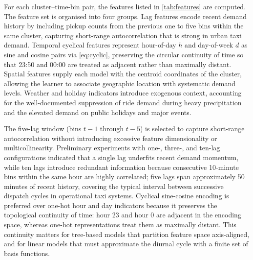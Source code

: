 For each cluster--time-bin pair, the features listed in \autoref{tab:features} are computed. The feature set is organised into four groups. Lag features encode recent demand history by including pickup counts from the previous one to five bins within the same cluster, capturing short-range autocorrelation that is strong in urban taxi demand. Temporal cyclical features represent hour-of-day $h$ and day-of-week $d$ as sine and cosine pairs via \eqref{eq:cyclic}, preserving the circular continuity of time so that 23:50 and 00:00 are treated as adjacent rather than maximally distant. Spatial features supply each model with the centroid coordinates of the cluster, allowing the learner to associate geographic location with systematic demand levels. Weather and holiday indicators introduce exogenous context, accounting for the well-documented suppression of ride demand during heavy precipitation and the elevated demand on public holidays and major events.

The five-lag window (bins $t{-}1$ through $t{-}5$) is selected to capture short-range autocorrelation without introducing excessive feature dimensionality or multicollinearity. Preliminary experiments with one-, three-, and ten-lag configurations indicated that a single lag underfits recent demand momentum, while ten lags introduce redundant information because consecutive 10-minute bins within the same hour are highly correlated; five lags span approximately 50 minutes of recent history, covering the typical interval between successive dispatch cycles in operational taxi systems. Cyclical sine-cosine encoding is preferred over one-hot hour and day indicators because it preserves the topological continuity of time: hour 23 and hour 0 are adjacent in the encoding space, whereas one-hot representations treat them as maximally distant. This continuity matters for tree-based models that partition feature space axis-aligned, and for linear models that must approximate the diurnal cycle with a finite set of basis functions.

